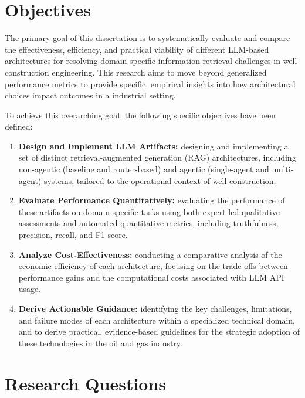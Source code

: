 \section{Objectives}

    The primary goal of this dissertation is to systematically evaluate and compare the effectiveness, efficiency, and practical viability of different LLM-based architectures for resolving domain-specific information retrieval challenges in well construction engineering. 
    This research aims to move beyond generalized performance metrics to provide specific, empirical insights into how architectural choices impact outcomes in a industrial setting.

    To achieve this overarching goal, the following specific objectives have been defined:

    \begin{enumerate}
        \item \textbf{Design and Implement LLM Artifacts:} designing and implementing a set of distinct retrieval-augmented generation (RAG)
        architectures, including non-agentic (baseline and router-based) and agentic (single-agent and multi-agent) systems, tailored to the operational context of well construction.

        \item \textbf{Evaluate Performance Quantitatively:} evaluating the performance of these artifacts on domain-specific tasks using both expert-led qualitative assessments and automated quantitative metrics, including truthfulness, precision, recall, and F1-score.

        \item \textbf{Analyze Cost-Effectiveness:} conducting a comparative analysis of the economic efficiency of each architecture, focusing on the trade-offs between performance gains and the computational costs associated with LLM API usage.

        \item \textbf{Derive Actionable Guidance:} identifying the key challenges, limitations, and failure modes of each architecture within a specialized technical domain, and to derive practical, evidence-based guidelines for the strategic adoption of these technologies in the oil and gas industry.
    \end{enumerate}




\section{Research Questions} \label{sec:research_questions}


